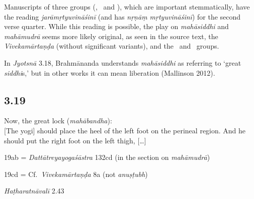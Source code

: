 \begin{ekdosis}
\begin{philcomm}[hp03_018]
Manuscripts of three groups (\textalpha, \textbeta\ and \textgamma), which are important stemmatically, have the reading \emph{jarāmṛtyuvināśinī} (and  has \emph{nṛṇāṃ mṛtyuvināśinī}) for the second verse quarter. While this reading is possible, the play on \emph{mahāsiddhi} and \emph{mahāmudrā} seems more likely original, as seen in the source text, the \emph{Vivekamārtaṇḍa} (without significant variants), and the \texteta\ and \textepsilon\ groups. 

In \emph{Jyotsnā} 3.18, Brahmānanda understands \emph{mahāsiddhi} as referring to `great \emph{siddhi}s,' but in other works it can mean liberation (Mallinson 2012).
\end{philcomm}

\subsection*{3.19}
\begin{translation}[hp03_019]
Now, the great lock (\emph{mahābandha}):\\
{}[The yogi] should place the heel of the left foot on the perineal region. And he should put the right foot on the left thigh, [\dots]
\end{translation}

\begin{sources}[hp03_019]
19ab = \emph{Dattātreyayogaśāstra} 132cd (in the section on \emph{mahāmudrā})
\begin{versinnote}
\end{versinnote}

19cd = Cf.~\emph{Vivekamārtaṇḍa} 8a (not \emph{anuṣṭubh})
\begin{versinnote}
\end{versinnote}
\end{sources}

\begin{testimonia}[hp03_019]
\emph{Haṭharatnāvalī} 2.43
\begin{versinnote}
\end{versinnote}


\end{testimonia}
\end{ekdosis}
